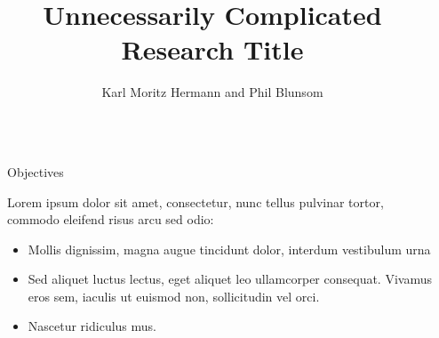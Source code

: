 \documentclass[final]{beamer}
\title{Unnecessarily Complicated Research Title} %
\author{Karl Moritz Hermann and Phil Blunsom} %
\institute{Department of Computer Science, University of Oxford} %
\newlength{\sepwid}
\newlength{\onecolwid}
\begin{document}

\setlength{\belowcaptionskip}{2ex} %
\setlength\belowdisplayshortskip{2ex} %

\begin{frame}[t] %

  \begin{columns}[t] %

  \begin{column}{\sepwid}\end{column} %

    \begin{column}{\onecolwid} %


      \begin{alertblock}{Objectives}

        Lorem ipsum dolor sit amet, consectetur, nunc tellus pulvinar tortor, commodo eleifend risus arcu sed odio:
        \begin{itemize}
          \item Mollis dignissim, magna augue tincidunt dolor, interdum vestibulum urna
          \item Sed aliquet luctus lectus, eget aliquet leo ullamcorper consequat. Vivamus eros sem, iaculis ut euismod non, sollicitudin vel orci.
          \item Nascetur ridiculus mus.
        \end{itemize}

      \end{alertblock}



\end{column}
\end{columns}
\end{frame}
\end{document}
